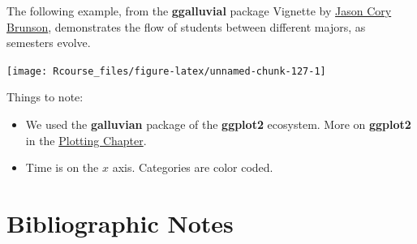 \documentclass[]{book}
\newenvironment{Shaded}{\begin{snugshade}}{\end{snugshade}}
\newcommand{\KeywordTok}[1]{\textcolor[rgb]{0.13,0.29,0.53}{\textbf{#1}}}
\newcommand{\DataTypeTok}[1]{\textcolor[rgb]{0.13,0.29,0.53}{#1}}
\newcommand{\StringTok}[1]{\textcolor[rgb]{0.31,0.60,0.02}{#1}}
\newcommand{\OperatorTok}[1]{\textcolor[rgb]{0.81,0.36,0.00}{\textbf{#1}}}
\newcommand{\NormalTok}[1]{#1}
\providecommand{\tightlist}{%
  \setlength{\itemsep}{0pt}\setlength{\parskip}{0pt}}
\theoremstyle{definition}
\theoremstyle{definition}
\theoremstyle{definition}
\theoremstyle{remark}
\begin{document}
The following example, from the \textbf{ggalluvial} package Vignette by
\href{https://cran.r-project.org/web/packages/ggalluvial/vignettes/ggalluvial.html}{Jason
Cory Brunson}, demonstrates the flow of students between different
majors, as semesters evolve.

\begin{Shaded}
\end{Shaded}

\texttt{[image: Rcourse\_files/figure-latex/unnamed-chunk-127-1]}

Things to note:

\begin{itemize}
\tightlist
\item
  We used the \textbf{galluvian} package of the \textbf{ggplot2}
  ecosystem. More on \textbf{ggplot2} in the
  \protect\hyperlink{plotting}{Plotting Chapter}.
\item
  Time is on the \(x\) axis. Categories are color coded.
\end{itemize}

\section{Bibliographic Notes}\label{bibliographic-notes-3}
\end{document}
